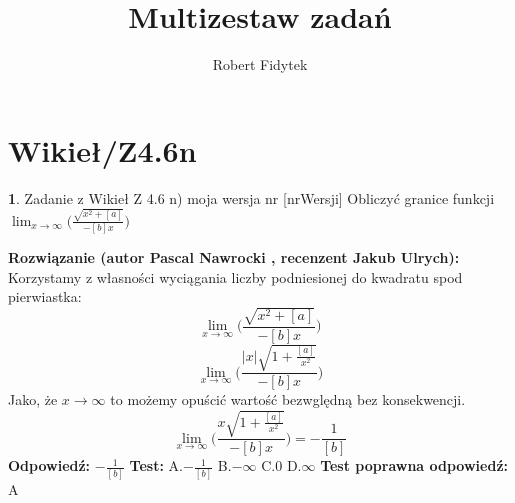 \documentclass[12pt, a4paper]{article}
\title{Multizestaw zadań}
\author{Robert Fidytek}
\date{}
\theoremstyle{definition} %
\newtheorem{zad}{}
\newcommand{\kategoria}[1]{\section{#1}} %
\newcommand{\zadStart}[1]{\begin{zad}#1\newline} %
\newcommand{\zadStop}{\end{zad}}   %
\newcommand{\rozwStart}[2]{\noindent \textbf{Rozwiązanie (autor #1 , recenzent #2): }\newline} %
\newcommand{\rozwStop}{\newline}                                            %
\newcommand{\odpStart}{\noindent \textbf{Odpowiedź:}\newline}    %
\newcommand{\odpStop}{\newline}                                             %
\newcommand{\testStart}{\noindent \textbf{Test:}\newline} %
\newcommand{\testStop}{\newline} %
\newcommand{\kluczStart}{\noindent \textbf{Test poprawna odpowiedź:}\newline} %
\newcommand{\kluczStop}{\newline} %
\begin{document}
\maketitle


\kategoria{Wikieł/Z4.6n}
\zadStart{Zadanie z Wikieł Z 4.6 n) moja wersja nr [nrWersji]}
Obliczyć granice funkcji $\displaystyle{\lim_{x \to \infty}}\bigg(\frac{\sqrt{x^2+[a]}}{-[b]x}\bigg)$
\zadStop
\rozwStart{Pascal Nawrocki}{Jakub Ulrych}
Korzystamy z własności wyciągania liczby podniesionej do kwadratu spod pierwiastka:
$$\displaystyle{\lim_{x \to \infty}}\bigg(\frac{\sqrt{x^2+[a]}}{-[b]x}\bigg)$$
$$\displaystyle{\lim_{x \to \infty}}\bigg(\frac{|x|\sqrt{1+\frac{[a]}{x^2}}}{-[b]x}\bigg)$$
Jako, że $x \to \infty$ to możemy opuścić wartość bezwględną bez konsekwencji.
$$\displaystyle{\lim_{x \to \infty}}\bigg(\frac{x\sqrt{1+\frac{[a]}{x^2}}}{-[b]x}\bigg)=-\frac{1}{[b]}$$
\rozwStop
\odpStart
$-\frac{1}{[b]}$
\odpStop
\testStart
A.$-\frac{1}{[b]}$
B.$-\infty$
C.$0$
D.$\infty$
\testStop
\kluczStart
A
\kluczStop
\end{document}
